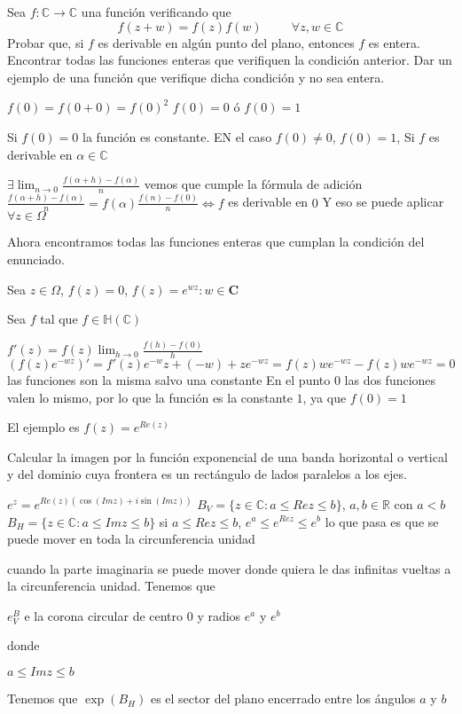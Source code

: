 \begin{ejer}
	Sea $f:\mathbb{C}\rightarrow\mathbb{C}$ una función verificando que
	$$ f(z+w) = f(z)f(w) \hspace{1cm} \forall z,w\in\mathbb{C} $$
	Probar que, si $f$ es derivable en algún punto del plano, entonces $f$ es entera. Encontrar todas las funciones enteras que verifiquen la condición anterior. Dar un ejemplo de una función que verifique dicha condición y no sea entera.
\end{ejer}

\begin{sol}

$f(0) = f(0+0) = f(0)^2$
$f(0)= 0$ ó $f(0) = 1$

Si $f(0)=0$ la función es constante.
EN el caso $f(0)\not =0$, $f(0)=1$, 
Si $f$ es derivable en $\alpha\in\mathbb{C}$

$\exists \lim_{n\rightarrow 0} \frac{f(\alpha+h)-f(\alpha)}{n}$
vemos que cumple la fórmula de adición 
$\frac{f(\alpha+h)-f(\alpha)}{n} = f(\alpha) \frac{f(n)-f(0)}{n} \Longleftrightarrow f$ es derivable en $0$
Y eso se puede aplicar $\forall z\in\Omega$

Ahora encontramos todas las funciones enteras que cumplan la condición del enunciado.

Sea $z\in\Omega$, $f(z)=0$, $f(z) = e^{wz} : w\in\mathbf{C}$

Sea $f$ tal que $f\in\mathbb{H}(\mathbb{C})$

$ f'(z) = f(z) \lim_{h\rightarrow 0} \frac{f(h)-f(0)}{h}$
$(f(z) e^{-wz})' = f'(z) e^{-w}z + (-w) +ze^{-wz} = f(z)we^{-wz} - f(z)we^{-wz} = 0$
las funciones son la misma salvo una constante
En el punto $0$ las dos funciones valen lo mismo, por lo que la función es la constante $1$, ya que $f(0)=1$


El ejemplo es $f(z) = e^{Re(z)}$
\end{sol}


\begin{ejer}
	Calcular la imagen por la función exponencial de una banda horizontal o vertical y del dominio cuya frontera es un rectángulo de lados paralelos a los ejes.
\end{ejer}

\begin{sol}

$e^z = e^{Re(z) (\cos(Imz) + i\sin(Imz))}$
$B_V = \{ z\in\mathbb{C} : a\leq Rez \leq b \}$, $a,b\in\mathbb{R}$ con $a<b$
$B_H = \{ z\in\mathbb{C} : a\leq Imz \leq b \}$
si $a\leq Rez \leq b$, $e^a \leq e^{Rez} \leq e^b$
lo que pasa es que se puede mover en toda la circunferencia unidad

cuando la parte imaginaria se puede mover donde quiera le das infinitas vueltas a la circunferencia unidad. Tenemos que

$e^B_V$ e la corona circular de centro $0$ y radios $e^a$ y $e^b$

donde

$a\leq Imz \leq b$

Tenemos que $\exp(B_H)$ es el sector del plano encerrado entre los ángulos $a$ y $b$
\end{sol}


